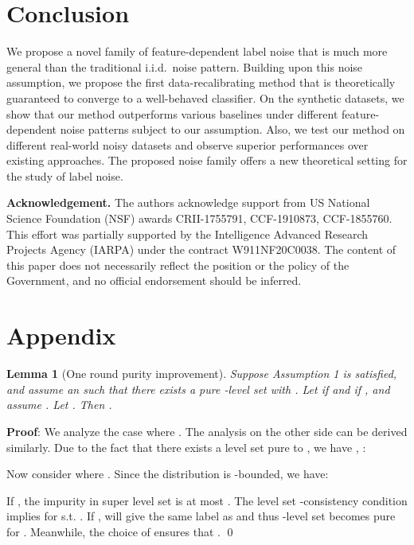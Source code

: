 \documentclass{article} \usepackage{iclr2021_conference,times}
\newtheorem{lemma}{Lemma}
\newcommand{\myparagraph}[1]{\textbf{#1}}
\begin{document}
\section{Conclusion}
We propose a novel family of feature-dependent label noise that is much more general than the traditional i.i.d.~noise pattern. Building upon this noise assumption, we propose the first data-recalibrating method that is theoretically guaranteed to converge to a well-behaved classifier. On the synthetic datasets, we show that our method outperforms various baselines under different feature-dependent noise patterns subject to our assumption. Also, we test our method on different real-world noisy datasets and observe superior performances over existing approaches. The proposed noise family offers a new theoretical setting for the study of label noise.

\myparagraph{Acknowledgement.}
The authors acknowledge support from US National Science Foundation (NSF) awards CRII-1755791, CCF-1910873, CCF-1855760. 
This effort was partially supported by the Intelligence Advanced Research Projects Agency (IARPA) under the contract W911NF20C0038. 
The content of this paper does not necessarily reflect the position or the policy of the Government, and no official endorsement should be inferred.




\appendix
\section{Appendix}
\setcounter{theorem}{0}
\setcounter{lemma}{0}
\setcounter{corollary}{0}

\begin{lemma}[One round purity improvement]
Suppose Assumption 1 is satisfied, and assume an  such that there exists a pure -level set with . Let  if  and  if  , and assume .
Let . Then . 


\end{lemma}

\textbf{Proof}: We analyze the case where . The analysis on the other side can be derived similarly.
Due to the fact that there exists a level set  pure to , we have 
, :

Now consider  where . Since the distribution  is -bounded, we have:  


If , the impurity in super level set   is at most . 
The level set -consistency condition implies  for  s.t. . If ,  will give the same label as  and thus -level set becomes pure for . Meanwhile, the choice of  ensures that .
\qed
\end{document}
